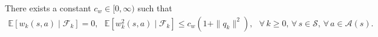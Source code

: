\begin{lemma}
\label{thm: properties of noise}
There exists a constant $c_w \in [0, \infty)$ 
such that
\begin{align}
\label{eq: condition on combined noise for proof}
\mathbb E[w_k(s,a) \mid \mathcal F_k] = 0,
\ \ \
\mathbb E[w_k^2(s,a) \mid \mathcal F_k] \le c_w(1+\|q_k\|^2),
\ \ \
\forall \, k \ge 0, \,
\forall \, s \in \mathcal S, \,
\forall \, a \in \mathcal A(s) .
\end{align}
\end{lemma}
